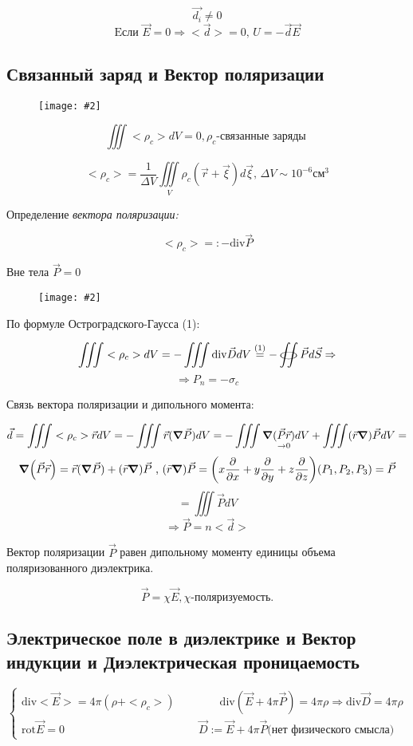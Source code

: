 \documentclass[a4paper,12pt]{article}
\newcommand{\kr}[1]{\textit{#1}}
\newcommand{\fc}[1]{\[#1\]}
\newcommand{\mm}[1]{\mathrm{#1}}
\newcommand{\oiint}{%
  \mathchoice%
    {\mathop{\raisebox{0.1ex}{\scalebox{1.7}[0.7]{\(\bigcirc\)}}}%
     \!\!\!\!\!\!\!\!\!\!\!\int\!\!\!\int}%
    {\mathop{\raisebox{0.3ex}{\scalebox{1.}[0.5]{\(\bigcirc\)}}}%
     \!\!\!\!\!\!\!\int\!\!\!\int}%
    {\mathop{\raisebox{0.1ex}{\scalebox{1}[0.8]{\(\bigcirc\)}}}%
     \!\!\!\!\!\!\!\!\!\int\!\!\!\int}%
    {\mathop{\raisebox{0.05ex}{\scalebox{0.8}[0.8]{\(\bigcirc\)}}}%
     \!\!\!\!\!\!\!\!\int\!\!\!\int}%
}
\newcommand{\imc}[2][0.7\textwidth]{%
    \begin{figure}[h!]
        \centering
        \texttt{[image: \#2]}
    \end{figure}%
}
\begin{document}
\fc{\vec{d_i}\neq0}
\fc{\text{Eсли }\vec{E}=0\Rightarrow <\vec{d}>=0\text{, }U=-\vec{d}\vec{E}}

\subsection*{Связанный заряд и Вектор поляризации}

\imc[0.4\textwidth]{32.png}

\fc{\iiint<\rho_c>dV=0, \rho_c\text{-связанные заряды }}

\fc{<\rho_c>=\frac{1}{\Delta V}\underset{V}{\iiint}\rho_c(\vec{r}+\vec{\xi})d\vec{\xi}\text{, }\Delta V\sim 10^{-6}\text{см}^3}

Определение\kr{ вектора поляризации:}

\fc{<\rho_c>=:-\mm{div}\vec{P}}

Вне тела $\vec{P}=0$

\newpage

\imc[0.3\textwidth]{33.png}

По формуле Остроградского-Гаусса (1):

\fc{\iiint<\rho_c>dV=-\iiint\mm{div}\vec{D}dV\overset{(1)}{=}-\oiint\vec{P}d\vec{S}\Rightarrow}
\fc{\Rightarrow P_n=-\sigma_c}

Связь вектора поляризации и дипольного момента:

\fc{\vec{d}=\iiint <\rho_c>\vec{r}dV=-\iiint\vec{r}(\grad\vec{P})dV=-\iiint\grad\underset{\rightarrow0}{(\vec{P}\vec{r})}dV+\iiint(\vec{r}\grad)\vec{P}dV=}
\fc{\grad(\vec{P}\vec{r})=\vec{r}(\grad\vec{P})+(\vec{r}\grad)\vec{P}\text{ , }(\vec{r}\grad)\vec{P}=\bigg(x\frac{\partial}{\partial x}+y\frac{\partial}{\partial y}+z\frac{\partial}{\partial z}\bigg)(P_1,P_2,P_3)=\vec{P}}
\fc{=\iiint\vec{P}dV}
\fc{\Rightarrow\vec{P}=n<\vec{d}>}

Вектор поляризации $\vec{P}$ равен дипольному моменту единицы объема поляризованного диэлектрика.

\fc{\vec{P}=\chi\vec{E}, \chi \text{-поляризуемость.}}

\subsection*{Электрическое поле в диэлектрике и Вектор индукции и Диэлектрическая проницаемость}

\fc{
\begin{cases}
\mm{div}<\vec{E}>=4\pi(\rho+<\rho_c>) \qquad\qquad  \mm{div}(\vec{E}+4\pi\vec{P})=4\pi\rho\Rightarrow \mm{div}\vec{D}=4\pi\rho\\
\mm{rot}\vec{E}=0 \qquad\qquad\qquad\qquad\qquad\quad\quad \vec{D}:=\vec{E}+4\pi\vec{P}\text{(нет физического смысла)}
\end{cases}}
\end{document}
